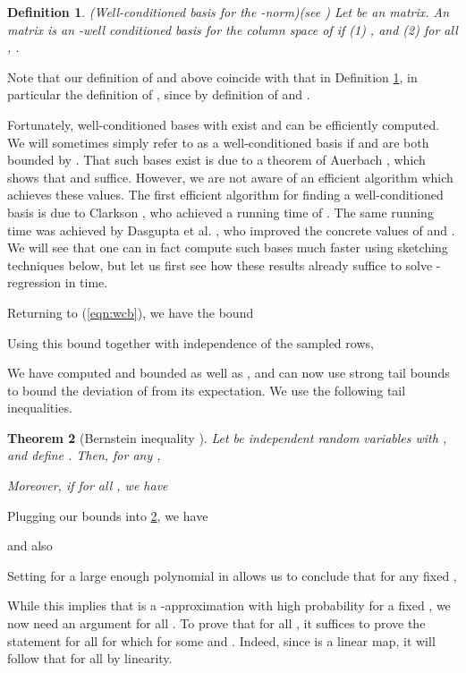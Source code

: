 \documentclass[11pt]{article}
\newtheorem{theorem}{Theorem}
\newtheorem{definition}[theorem]{Definition}
\begin{document}
\begin{definition}(Well-conditioned basis for the -norm)\label{def:wcb}(see \cite{DDHKM09})
Let  be an  matrix. An  matrix  is an -well conditioned
basis for the column space of  if (1) , and (2) for all ,
. 
\end{definition}
Note that our definition of  and  above coincide with that in Definition \ref{def:wcb},
in particular the definition of , 
since  by definition of  and . 

Fortunately, well-conditioned bases with  exist and can be efficiently computed. We
will sometimes simply refer to  as a well-conditioned basis if  and  are both bounded by .
That such bases exist is due to a theorem of Auerbach \cite{a30,ak08}, 
which shows that  and  suffice. 
However,
we are not aware of an efficient algorithm which achieves these values. The
first efficient algorithm for finding a well-conditioned basis is due to Clarkson \cite{Cla05}, 
who achieved a running time of . 
The same running time was achieved by 
Dasgupta et al. \cite{DDHKM09}, who improved the concrete values of  and . 
We will see that one can in fact compute such bases much faster using sketching techniques below, but let us first
see how these results already suffice to solve -regression in  time. 

Returning to (\ref{eqn:wcb}), we have the bound

Using this bound together with independence of the sampled rows, 

We have computed  and bounded  as well as , 
and can now use strong tail bounds to bound the deviation of
 from its expectation. We use the following tail inequalities.

\begin{theorem}[Bernstein inequality \cite{m03}]
\label{thm:bernstein}
Let  be independent random variables with 
, and define
. 
Then, for any ,

Moreover, if  for all , we have

\end{theorem}
Plugging our bounds into \ref{thm:bernstein}, we have

and also

Setting  
for a large enough polynomial in  allows us to conclude that for any fixed ,

While this implies that  is a -approximation with high probability for a fixed , 
we now need an argument for all .
To prove that  
for all , it suffices to prove the statement for all 
for which  for some  and . 
Indeed, since  is a linear map, it will follow that 
for all  by linearity. 
\end{document}
